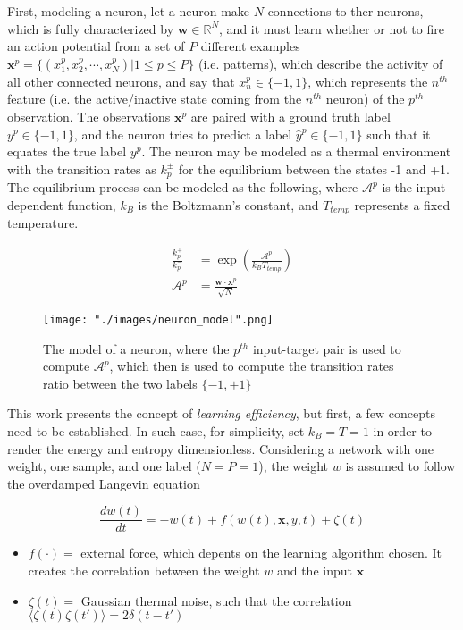 First, modeling a neuron, let a neuron make $N$ connections to ther neurons, which is fully characterized by $\bm{w} \in \mathbb{R}^N$, and it must learn whether or not to fire an action potential from a set of $P$ different examples $\bm{x}^p = \{ (x_1^p,x_2^p,\cdots,x_N^p) | 1\leq p \leq P \}$ (i.e. patterns), which describe the activity of all other connected neurons, and say that $x^p_n \in \{ -1, 1\}$, which represents the $n^{th}$ feature (i.e. the active/inactive state coming from the $n^{th}$ neuron) of the $p^{th}$ observation. The observations $\bm{x}^p$ are paired with a ground truth label $y^p \in \{-1,1\}$, and the neuron tries to predict a label $\hat{y}^p \in \{-1,1\}$ such that it equates the true label $y^p$. The neuron may be modeled as a thermal environment with the transition rates as $k_p^\pm$ for the equilibrium between the states -1 and +1. The equilibrium process can be modeled as the following, where $\mathcal{A}^p$ is the input-dependent function, $k_B$ is the Boltzmann's constant, and $T_{temp}$ represents a fixed temperature.

\begin{align*}
  \frac{k_p^+}{k_p^-} &= \exp\left(\frac{\mathcal{A}^p}{k_B T_{temp}} \right) \\
  \mathcal{A}^p &= \frac{\bm{w} \cdot \bm{x}^p}{\sqrt{N}}
\end{align*}

\begin{figure}[ht]
\begin{center}
    \texttt{[image: "./images/neuron\_model".png]}
    \caption{The model of a neuron, where the $p^{th}$ input-target pair is used to compute $\mathcal{A}^p$, which then is used to compute the transition rates ratio between the two labels $\{-1,+1\}$}
    \label{fig::model_neuron}
\end{center}
\end{figure}

This work presents the concept of \textit{learning efficiency}, but first, a few concepts need to be established. In such case, for simplicity, set $k_B = T = 1$ in order to render the energy and entropy dimensionless. Considering a network with one weight, one sample, and one label ($N=P=1$), the weight $w$ is assumed to follow the overdamped Langevin equation

$$ \frac{dw(t)}{dt} = - w(t) + f(w(t) , \bm{x}, y, t) + \zeta(t) $$

\begin{itemize}
    \item $f(\cdot) =$ external force, which depents on the learning algorithm chosen. It creates the correlation between the weight $w$ and the input $\bm{x}$
    \item $\zeta (t) = $ Gaussian thermal noise, such that the correlation $\langle \zeta(t)\zeta(t') \rangle = 2 \delta(t-t')$
\end{itemize}

